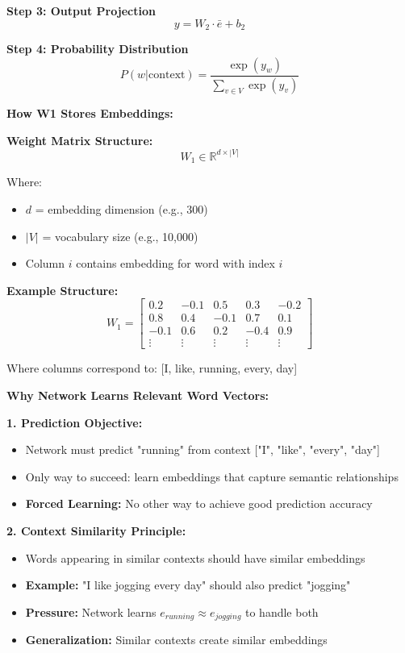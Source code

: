 \documentclass[12pt]{article}
\begin{document}
\begin{enumerate}[(a)]
{    \textbf{Step 3: Output Projection}
    $$y = W_2 \cdot \bar{e} + b_2$$
    
    \textbf{Step 4: Probability Distribution}
    $$P(w|\text{context}) = \frac{\exp(y_w)}{\sum_{v \in V} \exp(y_v)}$$
    
    \textbf{How W1 Stores Embeddings:}
    
    \textbf{Weight Matrix Structure:}
    $$W_1 \in \mathbb{R}^{d \times |V|}$$
    
    Where:
    \begin{itemize}
        \item $d$ = embedding dimension (e.g., 300)
        \item $|V|$ = vocabulary size (e.g., 10,000)
        \item Column $i$ contains embedding for word with index $i$
    \end{itemize}
    
    \textbf{Example Structure:}
    $$W_1 = \begin{bmatrix}
    0.2 & -0.1 & 0.5 & 0.3 & -0.2 \\
    0.8 & 0.4 & -0.1 & 0.7 & 0.1 \\
    -0.1 & 0.6 & 0.2 & -0.4 & 0.9 \\
    \vdots & \vdots & \vdots & \vdots & \vdots
    \end{bmatrix}$$
    
    Where columns correspond to: [I, like, running, every, day]
    
    \textbf{Why Network Learns Relevant Word Vectors:}
    
    \textbf{1. Prediction Objective:}
    \begin{itemize}
        \item Network must predict "running" from context ["I", "like", "every", "day"]
        \item Only way to succeed: learn embeddings that capture semantic relationships
        \item \textbf{Forced Learning:} No other way to achieve good prediction accuracy
    \end{itemize}
    
    \textbf{2. Context Similarity Principle:}
    \begin{itemize}
        \item Words appearing in similar contexts should have similar embeddings
        \item \textbf{Example:} "I like jogging every day" should also predict "jogging"
        \item \textbf{Pressure:} Network learns $e_{running} \approx e_{jogging}$ to handle both
        \item \textbf{Generalization:} Similar contexts create similar embeddings
    \end{itemize}
    
}
\end{enumerate}
\end{document}
